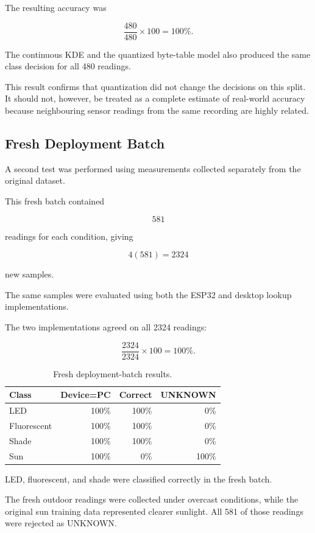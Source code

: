 \documentclass[10pt,a4paper,twocolumn]{article}
\begin{document}
The resulting accuracy was

\[
\frac{480}{480}\times100=100\%.
\]

The continuous KDE and the quantized byte-table model also produced the same
class decision for all 480 readings.

This result confirms that quantization did not change the decisions on this
split. It should not, however, be treated as a complete estimate of real-world
accuracy because neighbouring sensor readings from the same recording are
highly related.


\subsection{Fresh Deployment Batch}

A second test was performed using measurements collected separately from the
original dataset.

This fresh batch contained

\[
581
\]

readings for each condition, giving

\[
4(581)=2324
\]

new samples.

The same samples were evaluated using both the ESP32 and desktop lookup
implementations.

The two implementations agreed on all 2324 readings:

\[
\frac{2324}{2324}\times100=100\%.
\]

\begin{table}[H]
\centering
\caption{Fresh deployment-batch results.}
\label{tab:fresh}
\begin{tabular}{lrrr}
\toprule
Class & Device=PC & Correct & UNKNOWN \\
\midrule
LED & 100\% & 100\% & 0\% \\
Fluorescent & 100\% & 100\% & 0\% \\
Shade & 100\% & 100\% & 0\% \\
Sun & 100\% & 0\% & 100\% \\
\bottomrule
\end{tabular}
\end{table}

LED, fluorescent, and shade were classified correctly in the fresh batch.

The fresh outdoor readings were collected under overcast conditions, while
the original sun training data represented clearer sunlight. All 581 of those
readings were rejected as UNKNOWN.
\end{document}
